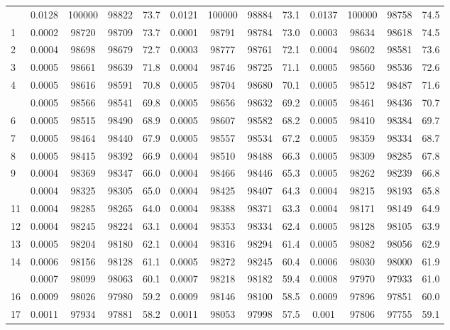 \documentclass[
  14pt,
]{article}
\begin{document}
\begin{longtable}[t]{lcccccccccccc}
\endfoot
\bottomrule
\endlastfoot
0 & 0.0128 & 100000 & 98822 & 73.7 & 0.0121 & 100000 & 98884 & 73.1 & 0.0137 & 100000 & 98758 & 74.5\\
1 & 0.0002 & 98720 & 98709 & 73.7 & 0.0001 & 98791 & 98784 & 73.0 & 0.0003 & 98634 & 98618 & 74.5\\
2 & 0.0004 & 98698 & 98679 & 72.7 & 0.0003 & 98777 & 98761 & 72.1 & 0.0004 & 98602 & 98581 & 73.6\\
3 & 0.0005 & 98661 & 98639 & 71.8 & 0.0004 & 98746 & 98725 & 71.1 & 0.0005 & 98560 & 98536 & 72.6\\
4 & 0.0005 & 98616 & 98591 & 70.8 & 0.0005 & 98704 & 98680 & 70.1 & 0.0005 & 98512 & 98487 & 71.6\\
\addlinespace
5 & 0.0005 & 98566 & 98541 & 69.8 & 0.0005 & 98656 & 98632 & 69.2 & 0.0005 & 98461 & 98436 & 70.7\\
6 & 0.0005 & 98515 & 98490 & 68.9 & 0.0005 & 98607 & 98582 & 68.2 & 0.0005 & 98410 & 98384 & 69.7\\
7 & 0.0005 & 98464 & 98440 & 67.9 & 0.0005 & 98557 & 98534 & 67.2 & 0.0005 & 98359 & 98334 & 68.7\\
8 & 0.0005 & 98415 & 98392 & 66.9 & 0.0004 & 98510 & 98488 & 66.3 & 0.0005 & 98309 & 98285 & 67.8\\
9 & 0.0004 & 98369 & 98347 & 66.0 & 0.0004 & 98466 & 98446 & 65.3 & 0.0005 & 98262 & 98239 & 66.8\\
\addlinespace
10 & 0.0004 & 98325 & 98305 & 65.0 & 0.0004 & 98425 & 98407 & 64.3 & 0.0004 & 98215 & 98193 & 65.8\\
11 & 0.0004 & 98285 & 98265 & 64.0 & 0.0004 & 98388 & 98371 & 63.3 & 0.0004 & 98171 & 98149 & 64.9\\
12 & 0.0004 & 98245 & 98224 & 63.1 & 0.0004 & 98353 & 98334 & 62.4 & 0.0005 & 98128 & 98105 & 63.9\\
13 & 0.0005 & 98204 & 98180 & 62.1 & 0.0004 & 98316 & 98294 & 61.4 & 0.0005 & 98082 & 98056 & 62.9\\
14 & 0.0006 & 98156 & 98128 & 61.1 & 0.0005 & 98272 & 98245 & 60.4 & 0.0006 & 98030 & 98000 & 61.9\\
\addlinespace
15 & 0.0007 & 98099 & 98063 & 60.1 & 0.0007 & 98218 & 98182 & 59.4 & 0.0008 & 97970 & 97933 & 61.0\\
16 & 0.0009 & 98026 & 97980 & 59.2 & 0.0009 & 98146 & 98100 & 58.5 & 0.0009 & 97896 & 97851 & 60.0\\
17 & 0.0011 & 97934 & 97881 & 58.2 & 0.0011 & 98053 & 97998 & 57.5 & 0.001 & 97806 & 97755 & 59.1\\

\end{longtable}
\end{document}
